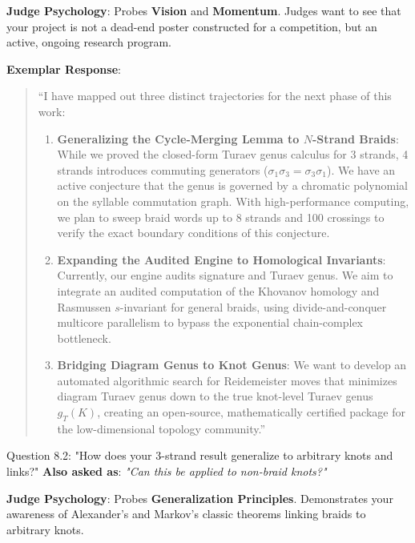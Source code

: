 \documentclass[11pt,letterpaper]{article}
\begin{document}
\begin{strategybox}
\textbf{Judge Psychology}: Probes \textbf{Vision} and \textbf{Momentum}. Judges want to see that your project is not a dead-end poster constructed for a competition, but an active, ongoing research program.
\end{strategybox}

\begin{exemplarbox}
\textbf{Exemplar Response}:
\begin{quote}
``I have mapped out three distinct trajectories for the next phase of this work:
\begin{enumerate}
    \item \textbf{Generalizing the Cycle-Merging Lemma to $N$-Strand Braids}:
    While we proved the closed-form Turaev genus calculus for 3 strands, 4 strands introduces commuting generators ($\sigma_1 \sigma_3 = \sigma_3 \sigma_1$). We have an active conjecture that the genus is governed by a chromatic polynomial on the syllable commutation graph. With high-performance computing, we plan to sweep braid words up to 8 strands and 100 crossings to verify the exact boundary conditions of this conjecture.
    \item \textbf{Expanding the Audited Engine to Homological Invariants}:
    Currently, our engine audits signature and Turaev genus. We aim to integrate an audited computation of the Khovanov homology and Rasmussen $s$-invariant for general braids, using divide-and-conquer multicore parallelism to bypass the exponential chain-complex bottleneck.
    \item \textbf{Bridging Diagram Genus to Knot Genus}:
    We want to develop an automated algorithmic search for Reidemeister moves that minimizes diagram Turaev genus down to the true knot-level Turaev genus $g_T(K)$, creating an open-source, mathematically certified package for the low-dimensional topology community.''
\end{enumerate}
\end{quote}
\end{exemplarbox}

\vspace{1em}

\begin{questionbox}{Question 8.2: "How does your 3-strand result generalize to arbitrary knots and links?"}
\textbf{Also asked as}: \textit{"Can this be applied to non-braid knots?"}
\end{questionbox}

\begin{strategybox}
\textbf{Judge Psychology}: Probes \textbf{Generalization Principles}. Demonstrates your awareness of Alexander's and Markov's classic theorems linking braids to arbitrary knots.
\end{strategybox}
\end{document}

